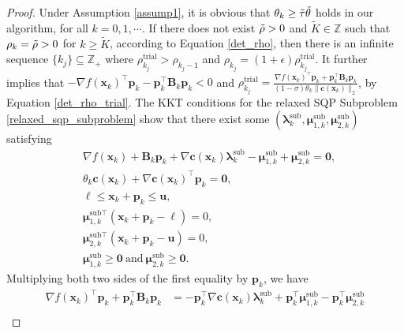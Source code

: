 \documentclass[aos]{imsart}
\numberwithin{equation}{section}
\theoremstyle{plain}
\begin{document}
\begin{appendix}
 \begin{proof}
     Under Assumption \ref{assump1}, it is obvious that $\theta_k \geq \Tilde{\tau} \Tilde{\theta}$ holds in our algorithm, for all $k=0,1, \cdots$. If there does not exist $\Tilde{\rho}>0$ and $\widetilde{K} \in \mathbb{Z}$ such that $\rho_k = \Tilde{\rho} > 0$ for $k \geq \widetilde{K}$, according to Equation \eqref{det_rho}, then there is an infinite sequence $\{k_j\} \subseteq \mathbb{Z}_{+}$ where $\rho_{k_j}^{\text{trial}}  > \rho_{k_j-1}$ and $\rho_{k_j} = (1+\epsilon) \rho_{k_j}^{\text{trial}}$. It further implies that $-\nabla f(\bm{x}_k)^{\top} \bm{p}_k - \bm{p}_k^{\top} \bm{B}_k \bm{p}_k < 0$ and $\rho_{k_j}^{\text{trial}} = \frac{\nabla f(\bm{x}_k)^{\top} \bm{p}_k + \bm{p}_k^{\top} \bm{B}_k \bm{p}_k}{(1-\sigma)\theta_k \|\bm{c}(\bm{x}_k)\|_2}$, by Equation \eqref{det_rho_trial}. The KKT conditions for the relaxed SQP Subproblem \eqref{relaxed_sqp_subproblem} show that
     there exist some $(\bm{\lambda}_k^{\text{sub}}, \bm{\mu}_{1,k}^{\text{sub}},\bm{\mu}_{2,k}^{\text{sub}})$ satisfying
     \begin{equation}
     \label{eq6}
         \begin{split}
             & \nabla f(\bm{x}_k) + \bm{B}_k \bm{p}_k + \nabla \bm{c}(\bm{x}_k) \bm{\lambda}_k^{\text{sub}} - \bm{\mu}_{1,k}^{\text{sub}} + \bm{\mu}_{2,k}^{\text{sub}} = \bm{0},\\
             & \theta_k \bm{c}(\bm{x}_{k})+ \nabla \bm{c}(\bm{x}_{k})^{\top}\bm{p}_k = \bm{0},\\
             & \bm{\ell} \leq \bm{x}_k + \bm{p}_k \leq \bm{u},\\
             & \bm{\mu}_{1,k}^{\text{sub} \top}(\bm{x}_k + \bm{p}_k - \bm{\ell}) = 0,\\
             & \bm{\mu}_{2,k}^{\text{sub} \top}(\bm{x}_k + \bm{p}_k - \bm{u}) = 0,\\
             & \bm{\mu}_{1,k}^{\text{sub}} \geq \bm{0}~\text{and}~ \bm{\mu}_{2,k}^{\text{sub}} \geq \bm{0}. 
         \end{split}
     \end{equation}
     Multiplying both two sides of the first equality by $\bm{p}_k$, we have
     \begin{equation*}
     \begin{split}
        \nabla f(\bm{x}_k)^{\top}\bm{p}_k + \bm{p}_k^{\top} \bm{B}_k \bm{p}_k & = -\bm{p}_k^{\top}\nabla \bm{c}(\bm{x}_k) \bm{\lambda}_k^{\text{sub}} + \bm{p}_k^{\top}\bm{\mu}_{1,k}^{\text{sub}} - \bm{p}_k^{\top}\bm{\mu}_{2,k}^{\text{sub}}\\

\end{split}
\end{equation*}
\end{proof}
\end{appendix}
\end{document}
